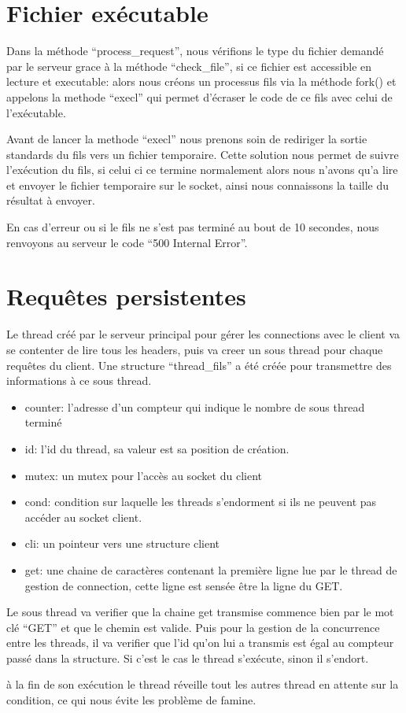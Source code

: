 \documentclass{article}
\begin{document}
\section{Fichier exécutable}

Dans la méthode ``process\_request'', nous vérifions le type du fichier demandé par le serveur grace à la méthode ``check\_file'', si ce fichier est accessible en lecture et executable: alors nous créons un processus fils via la méthode fork() et appelons la methode ``execl'' qui permet d'écraser le code de ce fils avec celui de l'exécutable. \hbox{}

Avant de lancer la methode ``execl'' nous prenons soin de rediriger la sortie standards du fils vers un fichier temporaire. Cette solution nous permet de suivre l'exécution du fils, si celui ci ce termine normalement alors nous n'avons qu'a lire et envoyer le fichier temporaire sur le socket, ainsi nous connaissons la taille du résultat à envoyer.

En cas d'erreur ou si le fils ne s'est pas terminé au bout de 10 secondes, nous renvoyons au serveur le code ``500 Internal Error''.

\section{Requêtes persistentes}

Le thread créé par le serveur principal pour gérer les connections avec le client va se contenter de lire tous les headers, puis va creer un sous thread pour chaque requêtes du client.
Une structure ``thread\_fils'' a été créée pour transmettre des informations à ce sous thread.
\begin{itemize}
\item counter: l'adresse d'un compteur qui indique le nombre de sous thread terminé
\item id: l'id du thread, sa valeur est sa position de création.
\item mutex: un mutex pour l'accès au socket du client
\item cond: condition sur laquelle les threads s'endorment si ils ne peuvent pas accéder
  au socket client.
\item cli: un pointeur vers une structure client
\item get: une chaine de caractères contenant la première ligne lue par le thread de gestion de connection, cette ligne est sensée être la ligne du GET.
\end{itemize}

Le sous thread va verifier que la chaine get transmise commence bien par le mot clé ``GET'' et que le chemin est valide. Puis pour la gestion de la concurrence entre les threads, il va verifier que l'id qu'on lui a transmis est égal au compteur passé dans la structure. Si c'est le cas le thread s'exécute, sinon il s'endort.

à la fin de son exécution le thread réveille tout les autres thread en attente sur la condition, ce qui nous évite les problème de famine.
\end{document}
